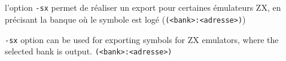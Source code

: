 \subsection{}

\begin{xfr}
l'option \texttt{-sx} permet de réaliser un export pour certaines émulateurs ZX, en précisant la banque où le symbole est logé (\texttt{(<bank>:<adresse>)})
\end{xfr}

\begin{xen}
\texttt{-sx} option can be used for exporting symbols for ZX emulators, where the selected bank is output. \texttt{(<bank>:<adresse>)}
\end{xen}
